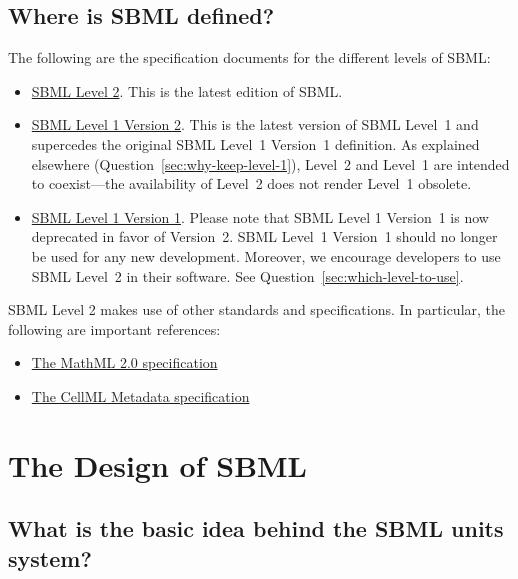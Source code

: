 \documentclass{sbmlfaq}
\begin{document}
\subsection{Where is SBML defined?}
\label{sec:spec-docs}
The following are the specification documents for the different levels of
SBML:

\begin{itemize}
  
\item \href{http://www.sbw-sbml.org/sbml/docs/index.html}{SBML Level 2}.
  This is the latest edition of SBML.
  
\item \href{http://www.sbw-sbml.org/sbml/docs/index.html}{SBML Level 1
    Version 2}.  This is the latest version of SBML Level~1 and supercedes
  the original SBML Level~1 Version~1 definition.  As explained elsewhere
  (Question~\ref{sec:why-keep-level-1}), Level~2 and Level~1 are intended to
  coexist---the availability of Level~2 does not render Level~1 obsolete.
  
\item \href{http://www.sbw-sbml.org/sbml/docs/index.html}{SBML Level 1
    Version 1}.  Please note that SBML Level 1 Version~1 is now deprecated
  in favor of Version~2.  SBML Level~1 Version~1 should no longer be used
  for any new development.  Moreover, we encourage developers to use SBML
  Level~2 in their software.  See Question~\ref{sec:which-level-to-use}.

\end{itemize}

SBML Level 2 makes use of other standards and specifications.  In
particular, the following are important references:

\begin{itemize}

\item \href{http://www.w3.org/TR/2003/WD-MathML2-20030411/}{The MathML 2.0 specification}

\item \href{http://www.cellml.org/public/metadata/}{The CellML Metadata specification}

\end{itemize}


\section{The Design of SBML}

\subsection{What is the basic idea behind the SBML units system?}
\end{document}
